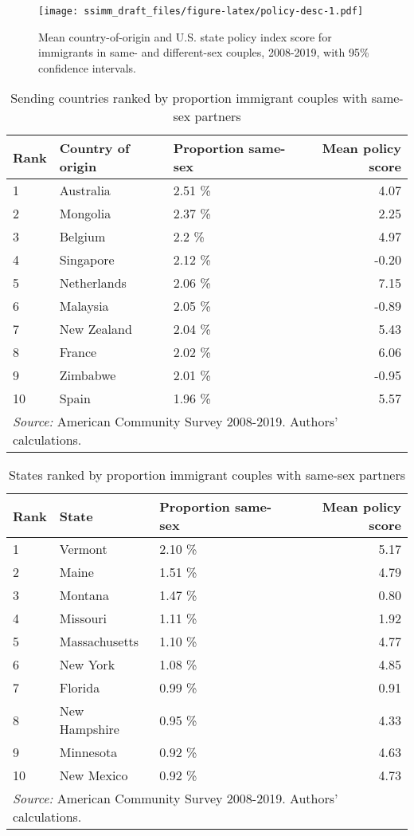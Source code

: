 \documentclass[
  11pt,
]{article}
\begin{document}
\begin{figure}
\centering
\texttt{[image: ssimm\_draft\_files/figure-latex/policy-desc-1.pdf]}
\caption{\label{fig:policy-desc}Mean country-of-origin and U.S. state policy index score for immigrants in same- and different-sex couples, 2008-2019, with 95\% confidence intervals.}
\end{figure}

\begin{table}

\caption{\label{tab:country-tab}Sending countries ranked by proportion immigrant couples with same-sex partners}
\centering
\begin{tabular}[t]{lllr}
\toprule
Rank & Country of origin & Proportion same-sex & Mean policy score\\
\midrule
1 & Australia & 2.51 \% & 4.07\\
2 & Mongolia & 2.37 \% & 2.25\\
3 & Belgium & 2.2 \% & 4.97\\
4 & Singapore & 2.12 \% & -0.20\\
5 & Netherlands & 2.06 \% & 7.15\\
6 & Malaysia & 2.05 \% & -0.89\\
7 & New Zealand & 2.04 \% & 5.43\\
8 & France & 2.02 \% & 6.06\\
9 & Zimbabwe & 2.01 \% & -0.95\\
10 & Spain & 1.96 \% & 5.57\\
\bottomrule
\multicolumn{4}{l}{\rule{0pt}{1em}\textit{Source:} American Community Survey 2008-2019. Authors' calculations.}\\
\end{tabular}
\end{table}

\begin{table}

\caption{\label{tab:state-tab}States ranked by proportion immigrant couples with same-sex partners}
\centering
\begin{tabular}[t]{lllr}
\toprule
Rank & State & Proportion same-sex & Mean policy score\\
\midrule
1 & Vermont & 2.10 \% & 5.17\\
2 & Maine & 1.51 \% & 4.79\\
3 & Montana & 1.47 \% & 0.80\\
4 & Missouri & 1.11 \% & 1.92\\
5 & Massachusetts & 1.10 \% & 4.77\\
6 & New York & 1.08 \% & 4.85\\
7 & Florida & 0.99 \% & 0.91\\
8 & New Hampshire & 0.95 \% & 4.33\\
9 & Minnesota & 0.92 \% & 4.63\\
10 & New Mexico & 0.92 \% & 4.73\\
\bottomrule
\multicolumn{4}{l}{\rule{0pt}{1em}\textit{Source:} American Community Survey 2008-2019. Authors' calculations.}\\
\end{tabular}
\end{table}
\end{document}
